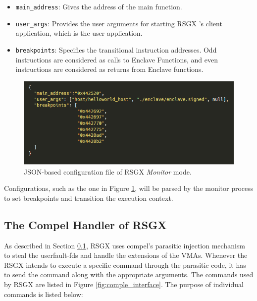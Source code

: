 \documentclass[article, doublespace,nopageskip]{VTthesis} %
\newcommand{\monitor}{RSGX \xspace}
\begin{document}
    \begin{itemize}
        \item \texttt{main\_address}: Gives the address of the main function.
        \item \texttt{user\_args}: Provides the user arguments for starting \monitor's client application, which is the user application.
        \item \texttt{breakpoints}: Specifies the transitional instruction addresses. Odd instructions are considered as calls to Enclave Functions, and even instructions are considered as returns from Enclave functions.
    \end{itemize}
    
    \begin{figure}[htb]
        \centering
        \includegraphics[scale=2.0]{figures/configuration_json.png}
        \caption{JSON-based configuration file of \monitor \textit{Monitor} mode.} 
        \label{fig:config_monitor}
    \end{figure}
    
    Configurations, such as the one in Figure \ref{fig:config_monitor}, will be parsed by the monitor process to set breakpoints and transition the execution context.

    \subsection{The Compel Handler of \monitor} \label{ase:compel handler}
    As described in Section \ref{ase:compel handler}, \monitor uses compel's parasitic injection mechanism to steal the userfault-fds and handle the extensions of the VMAs. Whenever the \monitor intends to execute a specific command through the parasitic code, it has to send the command along with the appropriate arguments. The commands used by \monitor are listed in Figure \ref{fig:comple_interface}. The purpose of individual commands is listed below:
\end{document}
